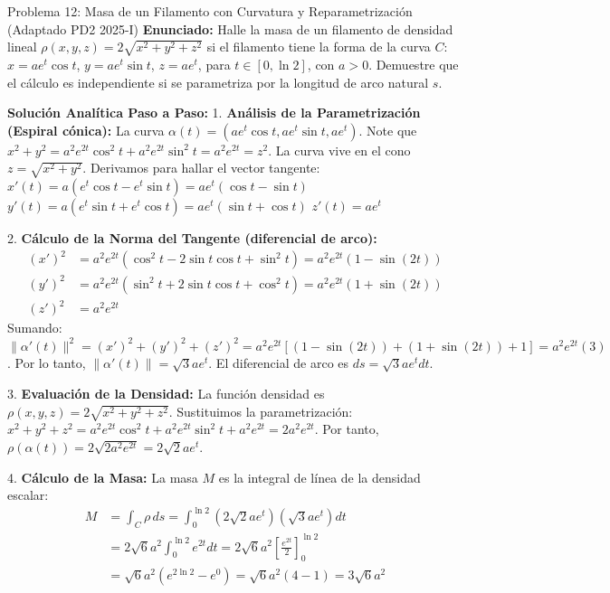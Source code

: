 \documentclass[11pt,a4paper]{article}
\begin{document}
\begin{ejerciciobox}{Problema 12: Masa de un Filamento con Curvatura y Reparametrización (Adaptado PD2 2025-I)}
\textbf{Enunciado:}
Halle la masa de un filamento de densidad lineal $\rho(x,y,z) = 2\sqrt{x^2 + y^2 + z^2}$ si el filamento tiene la forma de la curva $C$: $x = a e^t \cos t$, $y = a e^t \sin t$, $z = a e^t$, para $t \in [0, \ln 2]$, con $a > 0$. Demuestre que el cálculo es independiente si se parametriza por la longitud de arco natural $s$.

\textbf{Solución Analítica Paso a Paso:}
1. \textbf{Análisis de la Parametrización (Espiral cónica):}
La curva $\alpha(t) = (a e^t \cos t, a e^t \sin t, a e^t)$. Note que $x^2 + y^2 = a^2 e^{2t} \cos^2 t + a^2 e^{2t} \sin^2 t = a^2 e^{2t} = z^2$. La curva vive en el cono $z = \sqrt{x^2+y^2}$.
Derivamos para hallar el vector tangente:
$x'(t) = a (e^t \cos t - e^t \sin t) = a e^t (\cos t - \sin t)$
$y'(t) = a (e^t \sin t + e^t \cos t) = a e^t (\sin t + \cos t)$
$z'(t) = a e^t$

2. \textbf{Cálculo de la Norma del Tangente (diferencial de arco):}
\begin{align*}
(x')^2 &= a^2 e^{2t} (\cos^2 t - 2\sin t \cos t + \sin^2 t) = a^2 e^{2t} (1 - \sin(2t)) \\
(y')^2 &= a^2 e^{2t} (\sin^2 t + 2\sin t \cos t + \cos^2 t) = a^2 e^{2t} (1 + \sin(2t)) \\
(z')^2 &= a^2 e^{2t}
\end{align*}
Sumando:
$\|\alpha'(t)\|^2 = (x')^2 + (y')^2 + (z')^2 = a^2 e^{2t} [ (1-\sin(2t)) + (1+\sin(2t)) + 1 ] = a^2 e^{2t} (3)$.
Por lo tanto, $\|\alpha'(t)\| = \sqrt{3} a e^t$. El diferencial de arco es $ds = \sqrt{3} a e^t dt$.

3. \textbf{Evaluación de la Densidad:}
La función densidad es $\rho(x,y,z) = 2\sqrt{x^2+y^2+z^2}$.
Sustituimos la parametrización:
$x^2+y^2+z^2 = a^2 e^{2t} \cos^2 t + a^2 e^{2t} \sin^2 t + a^2 e^{2t} = 2a^2 e^{2t}$.
Por tanto, $\rho(\alpha(t)) = 2\sqrt{2 a^2 e^{2t}} = 2\sqrt{2} a e^t$.

4. \textbf{Cálculo de la Masa:}
La masa $M$ es la integral de línea de la densidad escalar:
\begin{align*}
M &= \int_C \rho \, ds = \int_0^{\ln 2} (2\sqrt{2} a e^t) (\sqrt{3} a e^t) dt \\
&= 2\sqrt{6} a^2 \int_0^{\ln 2} e^{2t} dt = 2\sqrt{6} a^2 \left[ \frac{e^{2t}}{2} \right]_0^{\ln 2} \\
&= \sqrt{6} a^2 (e^{2\ln 2} - e^0) = \sqrt{6} a^2 (4 - 1) = 3\sqrt{6} a^2
\end{align*}


\end{ejerciciobox}
\end{document}
